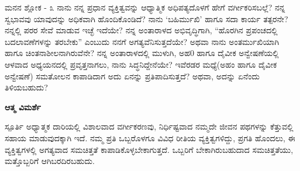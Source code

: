 \newpage
\begin{mananam}{\mananamfont \large \large ಮನನ ಶ್ಲೋಕ - ೩}
\mananamtext ನಾನು ನನ್ನ ಪ್ರಧಾನ ವ್ಯಕ್ತಿತ್ವವನ್ನು ಆಧ್ಯಾತ್ಮಿಕ ಅಧಿಪತ್ಯದೊಳಗೆ ಹೇಗೆ ವರ್ಗೀಕರಿಸಬಲ್ಲೆ? ನನ್ನ ಸ್ವಭಾವವು ಯಾವುದನ್ನು ಅಧಿಕವಾಗಿ ಹೊಂದಿಕೊಂಡಿದೆ? ನಾನು ‘ಬಹಿರ್ಮುಖಿ’ ಹಾಗೂ ಸದಾ ಕಾರ್ಯ ತತ್ಪರನೇ? ನನ್ನಲ್ಲಿ ಪರರ ಸೇವೆ ಮಾಡುವ  ಇಚ್ಛೆ ಇದೆಯೇ?  ನನ್ನ ಅಂತಾರಾಳದ ಅಭಿವೃದ್ಧಿಗಾಗಿ, “ಹೊರಗಿನ ಪ್ರಪಂಚದಲ್ಲಿ ಬದಲಾವಣೆಗಳನ್ನು ತರಬೇಕು” ಎಂಬುದು ನನಗೆ ಅಗತ್ಯವೆನಿಸುತ್ತದೆಯೇ? ಅಥವಾ ನಾನು ಅಂತರ್ಮುಖಿಯಾಗಿ ಹಾಗೂ ಚಿಂತನಾಶೀಲನಾಗಿರುವೆನೇ? ನನ್ನ ಅಂತಾರಾಳದಲ್ಲಿ ಮುಳುಗಿ, ಅಹ0 ಹಾಗೂ ದೈವೀಕ ಅನ್ವೇಷಣೆಯಲ್ಲಿ ಆಳವಾದ ಅಧ್ಯಯನದಲ್ಲಿ ಪ್ರವೃತ್ತನಾಗಲು, ನಾನು ಸಿದ್ಧನಿದ್ದೇನೆಯೇ? ಇವೆರಡರ ಮಧ್ಯೆ(ಅಹಂ ಹಾಗೂ ದೈವೀಕ ಅನ್ವೇಷಣೆ) ಸಮತೋಲನ ಕಾಪಾಡಿದಾಗ ಅದು ಏನನ್ನು ಪ್ರತಿಪಾದಿಸುತ್ತದೆ? ಅಥವಾ, ಅದನ್ನು ಏನೆಂದು ತಿಳಿಯಬಹುದು?
\end{mananam}
\WritingHand\enspace\textbf{ಆತ್ಮ ವಿಮರ್ಶೆ}\\
\begin{inspiration}{\mananamfont \large \large ಸ್ಪೂರ್ತಿ}
\mananamtext  ಅಧ್ಯಾತ್ಮಕ ದಾರಿಯಲ್ಲಿ ವಿಶಾಲವಾದ ವರ್ಗೀಕರಣವು, ನಿರ್ಧಿಷ್ಟವಾದ ನಮ್ಮದೇ ಜೀವನ ಪಥಗಳನ್ನು ಕೆತ್ತುವಲ್ಲಿ ಸಹಾಯ ಮಾಡುವುದಕ್ಕಾಗಿ ಇದೆ. ನಮ್ಮ ಪ್ರತಿ ಒಬ್ಬರೊಳಗೂ ವಿವಿಧ ರೀತಿಯ ವ್ಯಕ್ತಿತ್ವಗಳಿದ್ದು, ಪ್ರಗತಿ ಹೊಂದಲು, ಈ ವ್ಯಕ್ತಿತ್ವಗಳಲ್ಲಿ ಅಗತ್ಯವಾದ ಸಮಚಿತ್ತತೆ ಕಾಪಾಡಿಕೊಳ್ಳಬೇಕಾಗುತ್ತದೆ. ಒಬ್ಬರಿಗೆ ಬೇಕಾಗಿರುಬಹುದಾದ ಸಮಚಿತ್ತತೆಯು, ಮತ್ತೊಬ್ಬರಿಗೆ ಆಗಿಬರದಿರಬಹುದು.
\end{inspiration}
\newpage


